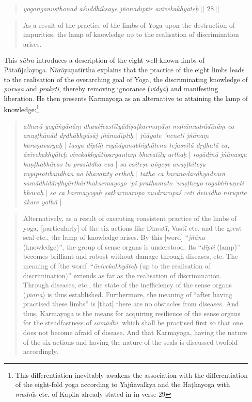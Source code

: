\begin{quote}
  \textit{yogāṅgānuṣṭhānād aśuddhikṣaye jñānadīptir āvivekakhyāteḥ} || 28 ||
\end{quote}
\begin{quote}
As a result of the practice of the limbs of Yoga upon the destruction of impurities, the lamp of knowledge up to the realisation of discrimination arises. 
\end{quote}

This \textit{sūtra} introduces a description of the eight well-known limbs of Pātañjalayoga. Nārāyaṇatīrtha explains that the practice of the eight limbs leads to the realisation of the overarching goal of Yoga, the discriminating knowledge of \textit{puruṣa} and \textit{prakṛti}, thereby removing ignorance (\textit{vidyā}) and manifesting liberation. He then presents Karmayoga as an alternative to attaining the lamp of knowledge:\footnote{This differentiation inevitably awakens the association with the differentiation of the eight-fold yoga according to Yajñavalkya and the Haṭhayoga with \textit{mudrā}s etc. of Kapila already stated in  in verse 29}

\begin{quote}
\textit{athavā yogāṅgānāṃ dhautīvastītyādiṣaṭkarmaṇāṃ mahāmudrādīnāṃ ca anuṣṭhānād dṛḍhābhyāsāj jñānadīptiḥ} | \textit{jñāyate 'neneti jñānaṃ karaṇavargaḥ} | \textit{tasya dīptiḥ rogādyanabhighātena tejasvitā dṛḍhatā ca, āvivekakhyāteḥ vivekakhyātiparyantaṃ bhavatīty arthaḥ} | \textit{rogādinā jñānasya kuṇṭhabhāvas tu prasiddha eva} | \textit{sa caiteṣv aṅgeṣv anuṣṭhiteṣu rogapratibandhān na bhavatīty arthaḥ} | \textit{tathā ca karaṇadārḍhyadvārā samādhidārḍhyārthārthakarmayogo 'pi prathamato 'nuṣṭheyo rogabhīruṇeti bhāvaḥ} | \textit{sa ca karmayogaḥ ṣaṭkarmarūpo mudrārūpaś ceti dvividho nirūpita ākare yathā} | 
\end{quote}
\begin{quote}
Alternatively, as a result of executing consistent practice of the limbs of yoga, [particularly] of the six actions like Dhautī, Vastī etc. and the great seal etc., the lamp of knowledge arises. By this [word] ``\textit{jñāna} (knowledge)'', the group of sense organs is understood. Its ``\textit{dīpti} (lamp)'' becomes brilliant and robust without damage through diseases, etc. The meaning of [the word] ``\textit{āvivekakhyāteḥ} (up to the realisation of discrimination)'' extends as far as the realisation of discrimination. Through diseases, etc., the state of the inefficiency of the sense organs (\textit{jñāna}) is thus established. Furthermore, the meaning of ``after having practised these limbs'' is [that] there are no obstacles from diseases. And thus, Karmayoga is the means for acquiring resilience of the sense organs for the steadfastness of \textit{samādhi}, which shall be practised first so that one does not become afraid of disease. And that Karmayoga, having the nature of the six actions and having the nature of the seals is discussed twofold accordingly.
\end{quote}

